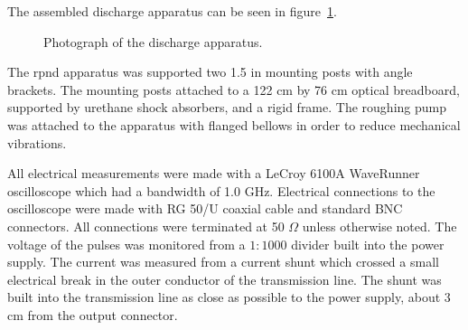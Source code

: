 The assembled discharge apparatus can be seen in figure~\ref{fig:appphoto}.
\begin{figure}
  \centering
  \setlength\fboxsep{0pt}
  \setlength\fboxrule{1.0pt}
  \caption{Photograph of the discharge apparatus.}
  \label{fig:appphoto}
\end{figure}
The \acs{rpnd} apparatus was supported two 1.5 in mounting posts with angle
brackets. The mounting posts attached to a 122 cm by 76 cm optical breadboard,
supported by urethane shock absorbers, and a rigid frame. The roughing pump was
attached to the apparatus with flanged bellows in order to reduce mechanical
vibrations.

All electrical measurements were made with a LeCroy 6100A WaveRunner
oscilloscope which had a bandwidth of 1.0 GHz. Electrical connections to the
oscilloscope were made with RG 50/U coaxial cable and standard BNC connectors.
All connections were terminated at 50 $\Omega$ unless otherwise noted. The
voltage of the pulses was monitored from a $1:1000$ divider built into the power
supply. The current was measured from a current shunt which crossed a small
electrical break in the outer conductor of the transmission line. The shunt was
built into the transmission line as close as possible to the power supply, about
3 cm from the output connector.

